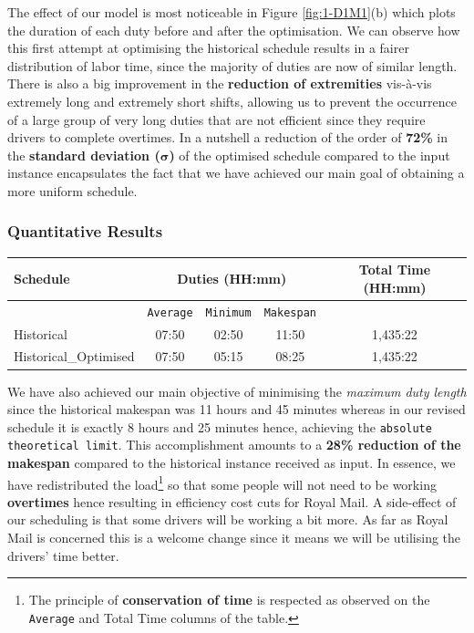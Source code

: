 \vspace{\baselineskip}
\noindent
The effect of our model is most noticeable in Figure \ref{fig:1-D1M1}(b) which plots the duration of each duty before and after the optimisation. We can observe how this first attempt at optimising the historical schedule results in a fairer distribution of labor time, since the majority of duties are now of similar length. There is also a big improvement in the \textbf{reduction of extremities} vis-\`a-vis extremely long and extremely short shifts, allowing us to prevent the occurrence of a large group of very long duties that are not efficient since they require drivers to complete overtimes. In a nutshell a reduction of the order of \textbf{72\%} in the \textbf{standard deviation ($\pmb{\sigma}$)} of the optimised schedule compared to the input instance encapsulates the fact that we have achieved our main goal of obtaining a more uniform schedule.

\subsubsection*{Quantitative Results}


\begin{table}[h]
\small
    \centering 
    \begin{tabular}{|l|c|c|c|c|}
        \hline
        \textbf{Schedule} & \multicolumn{3}{|c|}{ \textbf{Duties (HH:mm)}} & \textbf{Total Time (HH:mm)}  \\
        \hline
        & \texttt{Average} &  \texttt{Minimum} & \texttt{Makespan} & \\
        \hline
        Historical & 07:50 & 02:50 & 11:50 & 1,435:22 \\
        \hline
        Historical\_Optimised & 07:50 & 05:15 & 08:25 & 1,435:22 \\
        \hline
    \end{tabular}%
    \medbreak
\end{table}


\vspace{\baselineskip}
\noindent
We have also achieved our main objective of minimising the \textit{maximum duty length} since the historical makespan was 11 hours and 45 minutes whereas in our revised schedule it is exactly 8 hours and 25 minutes hence, achieving the \texttt{absolute theoretical limit}. This accomplishment amounts to a \textbf{28\% reduction of the makespan} compared to the historical instance received as input. In essence, we have redistributed the load\footnote{The principle of \textbf{conservation of time} is respected as observed on the \texttt{Average} and Total Time columns of the table.} so that some people will not need to be working \textbf{overtimes} hence resulting in efficiency cost cuts for Royal Mail. A side-effect of our scheduling is that some drivers will be working a bit more. As far as Royal Mail is concerned this is a welcome change since it means we will be utilising the drivers' time better.

